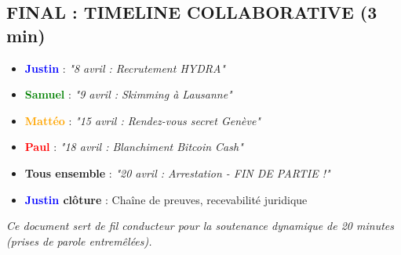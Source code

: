 \documentclass[11pt,a4paper]{article}
\begin{document}
\subsection{FINAL : TIMELINE COLLABORATIVE (3 min)}
\begin{itemize}[leftmargin=*]
    \item \textbf{\textcolor{blue}{Justin}} : \textit{"8 avril : Recrutement HYDRA"}
    \item \textbf{\textcolor{green}{Samuel}} : \textit{"9 avril : Skimming à Lausanne"}
    \item \textbf{\textcolor{orange}{Mattéo}} : \textit{"15 avril : Rendez-vous secret Genève"}
    \item \textbf{\textcolor{red}{Paul}} : \textit{"18 avril : Blanchiment Bitcoin Cash"}
    \item \textbf{Tous ensemble} : \textit{"20 avril : Arrestation - FIN DE PARTIE !"}
    \item \textbf{\textcolor{blue}{Justin} clôture} : Chaîne de preuves, recevabilité juridique
\end{itemize}

\vfill
\centering
\textit{Ce document sert de fil conducteur pour la soutenance dynamique de 20 minutes (prises de parole entremêlées).}
\end{document}
